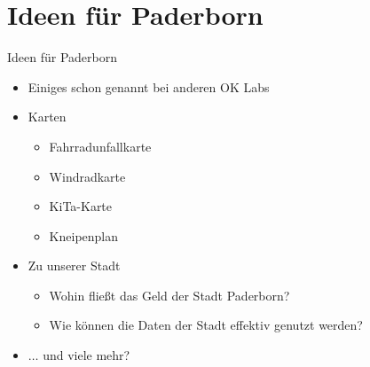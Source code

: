 \section{Ideen für Paderborn}

\begin{frame}{Ideen für Paderborn}
 \begin{itemize}
  \item Einiges schon genannt bei anderen OK Labs
  \item Karten
  \begin{itemize}
   \item Fahrradunfallkarte
   \item Windradkarte
   \item KiTa-Karte
   \item Kneipenplan
  \end{itemize}
  \item Zu unserer Stadt
  \begin{itemize}
   \item Wohin fließt das Geld der Stadt Paderborn?
   \item Wie können die Daten der Stadt effektiv genutzt werden?
  \end{itemize}
  \item $\dots$ und viele mehr?
 \end{itemize}
\end{frame}